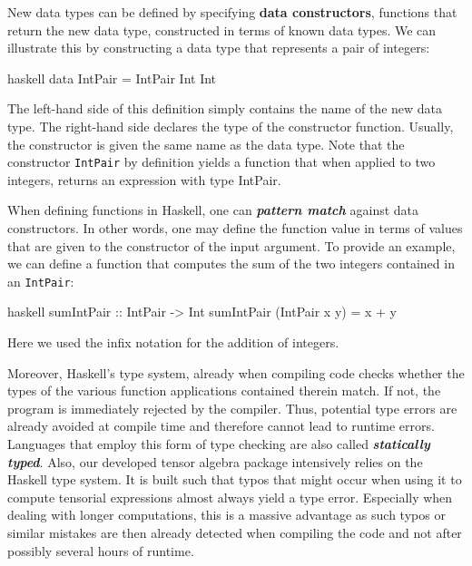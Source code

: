 New data types can be defined by specifying \textbf{\textbf{data constructors}}, functions that  return the new data type, constructed in terms of known data types. We can illustrate this by constructing a data type that represents a pair of integers:
\begin{center}
\begin{cminted}{haskell}
data IntPair = IntPair Int Int 
\end{cminted}
\end{center}
The left-hand side of this definition simply contains the name of the new data type. The right-hand side declares the type of the constructor function. Usually, the constructor is given the same name as the data type. 
Note that the constructor \texttt{IntPair} by definition yields a function that when applied to two integers, returns an expression with type IntPair. 

When defining functions in Haskell, one can \textbf{\textit{pattern match}} against data constructors. In other words, one may define the function value in terms of values that are given to the constructor of the input argument. To provide an example, we can define a function that computes the sum of the two integers contained in an \texttt{IntPair}:
\begin{center}
\begin{cminted}{haskell}
sumIntPair :: IntPair -> Int 
sumIntPair (IntPair x y) = x + y
\end{cminted}
\end{center}
Here we used the infix notation for the addition of integers. 

Moreover, Haskell's type system, already when compiling code checks whether the types of the various function applications contained therein match. If not, the program is immediately rejected by the compiler. Thus, potential type errors are already avoided at compile time and therefore cannot lead to runtime errors. Languages that employ this form of type checking are also called \textit{\textbf{statically typed}}. Also, our developed tensor algebra package intensively relies on the Haskell type system. It is built such that typos that might occur when using it to compute tensorial expressions almost always yield a type error. Especially when dealing with longer computations, this is a massive advantage as such typos or similar mistakes are then already detected when compiling the code and not after possibly several hours of runtime.  

